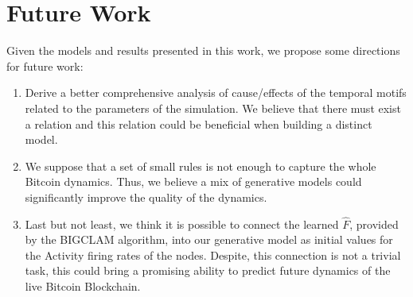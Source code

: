 \section{Future Work}
\label{sec:future_work}

Given the models and results presented in this work, we propose some directions for future work:
\begin{enumerate}
  \item{Derive a better comprehensive analysis of cause/effects of the temporal motifs related to the parameters of the simulation. We believe that there must exist a relation and this relation could be beneficial when building a distinct model.}
   
  \item{We suppose that a set of small rules is not enough to capture the whole Bitcoin dynamics. Thus, we believe a mix of generative models could significantly improve the quality of the dynamics.}
  
  \item{Last but not least, we think it is possible to connect the learned $\hat{F}$, provided by the BIGCLAM algorithm, into our generative model as initial values for the Activity firing rates of the nodes. Despite, this connection is not a trivial task, this could bring a promising ability to predict future dynamics of the live Bitcoin Blockchain.}
\end{enumerate}

